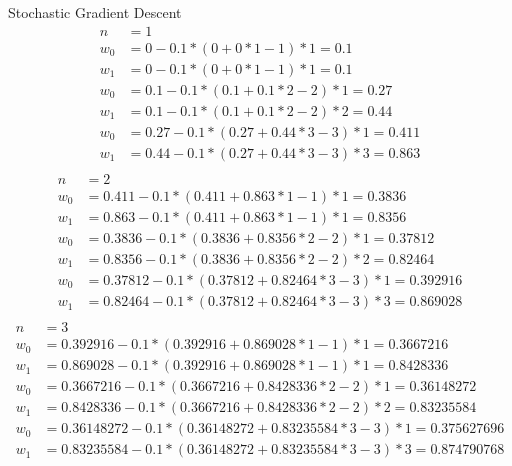 \documentclass{report}
\begin{document}
Stochastic Gradient Descent
\begin{equation} \label{eq1}
\begin{split}
  n & = 1 \\
w_0 & = 0 - 0.1 * (0+0*1-1) * 1 = 0.1\\
w_1 & = 0 - 0.1 * (0+0*1-1) * 1 = 0.1\\
w_0 & = 0.1 - 0.1 * (0.1+0.1*2-2) * 1 = 0.27\\
w_1 & = 0.1 - 0.1 * (0.1+0.1*2-2) * 2 = 0.44\\
w_0 & = 0.27 - 0.1 * (0.27+0.44*3-3) * 1 = 0.411\\
w_1 & = 0.44 - 0.1 * (0.27+0.44*3-3) * 3 = 0.863\\
\end{split}
\end{equation}
\begin{equation} \label{eq1}
\begin{split}
  n & = 2 \\
w_0 & = 0.411 - 0.1 * (0.411+0.863*1-1) * 1 = 0.3836\\
w_1 & = 0.863 - 0.1 * (0.411+0.863*1-1) * 1 = 0.8356\\
w_0 & = 0.3836 - 0.1 * (0.3836+0.8356*2-2) * 1 = 0.37812\\
w_1 & = 0.8356 - 0.1 * (0.3836+0.8356*2-2) * 2 = 0.82464\\
w_0 & = 0.37812 - 0.1 * (0.37812+0.82464*3-3) * 1 = 0.392916\\
w_1 & = 0.82464 - 0.1 * (0.37812+0.82464*3-3) * 3 = 0.869028\\
\end{split}
\end{equation}
\begin{equation} \label{eq1}
\begin{split}
  n & = 3 \\
w_0 & = 0.392916 - 0.1 * (0.392916+0.869028*1-1) * 1 = 0.3667216\\
w_1 & = 0.869028 - 0.1 * (0.392916+0.869028*1-1) * 1 = 0.8428336\\
w_0 & = 0.3667216 - 0.1 * (0.3667216+0.8428336*2-2) * 1 = 0.36148272\\
w_1 & = 0.8428336 - 0.1 * (0.3667216+0.8428336*2-2) * 2 = 0.83235584\\
w_0 & = 0.36148272 - 0.1 * (0.36148272+0.83235584*3-3) * 1 = 0.375627696\\
w_1 & = 0.83235584 - 0.1 * (0.36148272+0.83235584*3-3) * 3 = 0.874790768\\
\end{split}
\end{equation}
\end{document}
